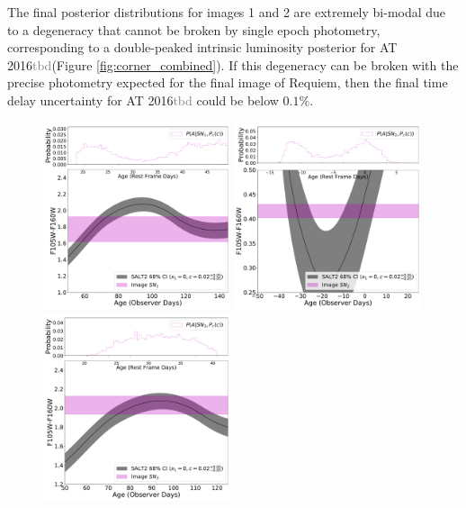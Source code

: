 \documentclass[12pt,dvipsnames]{article}
\def\SNABC{AT 2016{\textcolor{Gray}{tbd}}\xspace}
\begin{document}
The final posterior distributions for images 1 and 2 are extremely bi-modal due to a degeneracy that cannot be broken by single epoch photometry, corresponding to a double-peaked intrinsic luminosity posterior for \SNABC (Figure \ref{fig:corner_combined}). If this degeneracy can be broken with the precise photometry expected for the final image of Requiem, then the final time delay uncertainty for \SNABC could be below $0.1\%$.


\begin{figure}
    \centering
    \includegraphics[width=0.49\textwidth]{Paper/Figures/colorcurve_image1.pdf}
    \includegraphics[width=0.49\textwidth]{Paper/Figures/colorcurve_image2.pdf}
    \includegraphics[width=0.49\textwidth]{Paper/Figures/colorcurve_image3.pdf}

\end{figure}
\end{document}
